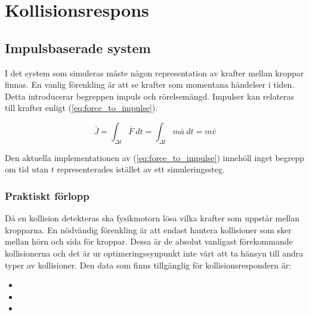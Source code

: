\documentclass[a4paper,12pt,twopage,swedish]{article}
\begin{document}



\section{Kollisionsrespons}
\subsection{Impulsbaserade system}
I det system som simuleras måste någon representation av krafter mellan kroppar finnas. En vanlig förenkling är att se krafter som momentana händelser i tiden. Detta introducerar begreppen impuls och rörelsemängd. Impulser kan relateras till krafter enligt (\ref{eq:force_to_impulse}).

\begin{equation}\label{eq:force_to_impulse}
\bar{J} = \int_{\Delta t}^{} \bar{F} \ dt = \int_{\Delta t}^{} m\bar{a} \ dt = m\bar{v}
\end{equation}

Den aktuella implementationen av (\ref{eq:force_to_impulse}) innehöll inget begrepp om tid utan $t$ representerades istället av ett simuleringssteg.

\subsubsection{Praktiskt förlopp}
Då en kollision detekteras ska fysikmotorn lösa vilka krafter som uppstår mellan kropparna. En nödvändig förenkling är att endast hantera kollisioner som sker mellan hörn och sida för kroppar. Dessa är de absolut vanligast förekommande kollisionerna och det är ur optimeringssynpunkt inte värt att ta hänsyn till andra typer av kollisioner. Den data som finns tillgänglig för kollisionsrespondern är:

\begin{itemize}
\item {}
\item {}
\item {}
\end{itemize}
\end{document}
